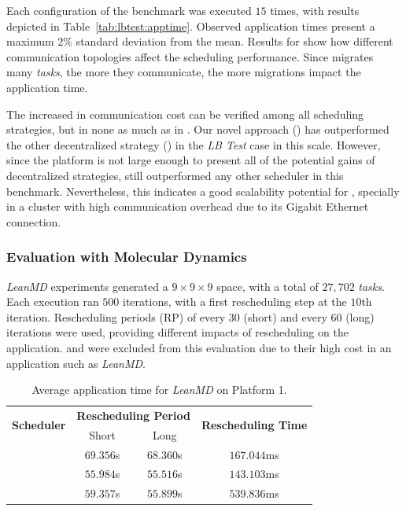 Each configuration of the benchmark was executed $15$ times, with results depicted in Table~\ref{tab:lbtest:apptime}.
Observed application times present a maximum $2\%$ standard deviation from the mean. 
Results for \greedylb show how different communication topologies affect the scheduling performance.
Since \greedylb migrates many \textit{tasks}, the more they communicate, the more migrations impact the application time.

The increased in communication cost can be verified among all scheduling strategies, but in none as much as in \greedylb.
Our novel approach (\packdrop) has outperformed the other decentralized strategy (\distributedlb) in the \textit{LB Test} case in this scale.
However, since the platform is not large enough to present all of the potential gains of decentralized strategies,  still outperformed any other scheduler in this benchmark.
Nevertheless, this indicates a good scalability potential for \packdrop, specially in a cluster with high communication overhead due to its Gigabit Ethernet connection. %

\subsubsection{Evaluation with Molecular Dynamics} \label{sec:cluster:md}

\textit{LeanMD} experiments generated a $9\times9\times9$ space, with a total of $27,702$ \textit{tasks}.
Each execution ran $500$ iterations, with a first rescheduling step at the $10$th iteration. 
Rescheduling periods (RP) of every $30$ (short) and every $60$ (long) iterations were used, providing different impacts of rescheduling on the application.
\greedylb and \dummylb were excluded from this evaluation due to their high cost in an application such as \textit{LeanMD}. 

\begin{table}[!ht]
	\centering
	\caption{Average application time for \textit{LeanMD} on Platform 1.}	
	\begin{tabular}{l c c c}
	\toprule
	\multirow{2}{*}{\textbf{Scheduler}} 	& \multicolumn{2}{c}{\textbf{Rescheduling Period}} & \multirow{2}{*}{\textbf{Rescheduling Time}} \\ \cmidrule{2-3}
 								& Short & Long \\	
	\midrule
	
	\distributedlb & $69.356$s & $68.360$s & $167.044$ms \\ 
	\packdrop & $55.984$s & $55.516$s & $143.103$ms \\ 
	 & $59.357$s & $55.899$s & $539.836$ms \\ 
	\bottomrule	
	\end{tabular}
	\label{tab:eval:g5k:leanmd:time} 
\end{table}

